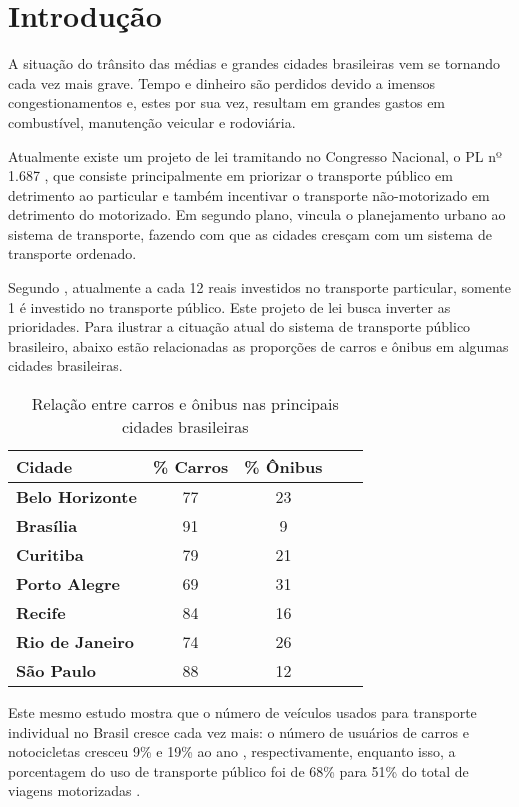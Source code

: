 \chapter{Introdução}
A situação do trânsito das médias e grandes cidades brasileiras vem se tornando cada vez mais grave.
Tempo e dinheiro são perdidos devido a imensos congestionamentos e, estes por sua vez, resultam em grandes gastos em combustível, manutenção veicular e rodoviária.

Atualmente existe um projeto de lei tramitando no Congresso Nacional, o PL nº 1.687 \cite{FlexaRibeiro2010}, que consiste principalmente em priorizar o transporte público em detrimento ao particular e também incentivar o transporte não-motorizado em detrimento do motorizado.
Em segundo plano, vincula o planejamento urbano ao sistema de transporte, fazendo com que as cidades cresçam com um sistema de transporte ordenado.

Segundo \cite{IPEA2011}, atualmente a cada 12 reais investidos no transporte particular, somente 1 é investido no transporte público.
Este projeto de lei busca inverter as prioridades.
Para ilustrar a cituação atual do sistema de transporte público brasileiro, abaixo estão relacionadas as proporções de carros e ônibus em algumas cidades brasileiras.

\begin{table}[!htb]
	\centering
	\caption{Relação entre carros e ônibus nas principais cidades brasileiras}
	\label{tab:carro_onibus}
	\begin{tabular}{lcccc}
		\hline
		\textbf{Cidade} & \textbf{\% Carros} & \textbf{\% Ônibus} \\
		\hline
		\textbf{Belo Horizonte} & 77 & 23 \\
		\textbf{Brasília} & 91 & 9 \\
		\textbf{Curitiba} & 79 & 21 \\
		\textbf{Porto Alegre} & 69 & 31 \\
		\textbf{Recife} & 84 & 16 \\
		\textbf{Rio de Janeiro} & 74 & 26 \\
		\textbf{São Paulo} & 88 & 12 \\
		\hline
	\end{tabular}
\end{table}

Este mesmo estudo mostra que o número de veículos usados para transporte individual no Brasil cresce cada vez mais: o número de usuários de carros e notocicletas cresceu 9\% e 19\% ao ano , respectivamente, enquanto isso, a porcentagem do uso de transporte público foi de 68\% para 51\% do total de viagens motorizadas \cite{IPEA2011}.

